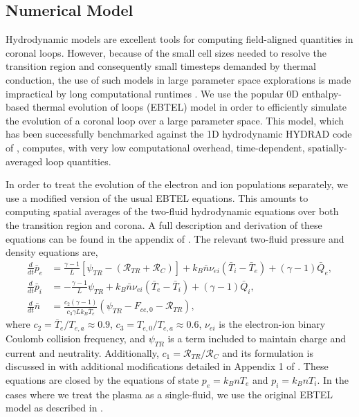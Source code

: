 \documentclass[preprint,linenumbers]{aastex}
\begin{document}
	\subsection{Numerical Model}
	\label{subsec:numerics}
	\par Hydrodynamic models are excellent tools for computing field-aligned quantities in coronal loops. However, because of the small cell sizes needed to resolve the transition region and consequently small timesteps demanded by thermal conduction, the use of such models in large parameter space explorations is made impractical by long computational runtimes \citep{bradshaw_influence_2013}. We use the popular 0D enthalpy-based thermal evolution of loops (EBTEL) model \citep{klimchuk_highly_2008,cargill_enthalpy-based_2012,cargill_enthalpy-based_2012-1,cargill_modelling_2015} in order to efficiently simulate the evolution of a coronal loop over a large parameter space. This model, which has been successfully benchmarked against the 1D hydrodynamic HYDRAD code of \citet{bradshaw_influence_2013}, computes, with very low computational overhead, time-dependent, spatially-averaged loop quantities.
	\par In order to treat the evolution of the electron and ion populations separately, we use a modified version of the usual EBTEL equations. This amounts to computing spatial averages of the two-fluid hydrodynamic equations over both the transition region and corona. A full description and derivation of these equations can be found in the appendix of . The relevant two-fluid pressure and density equations are,
	\begin{align}
		\frac{d}{dt}\bar{p}_e &= \frac{\gamma - 1}{L}\left\lbrack\psi_{TR} - (\mathcal{R}_{TR} + \mathcal{R}_C)\right\rbrack + k_B\bar{n}\nu_{ei}(\bar{T}_i - \bar{T}_e) + (\gamma - 1)\bar{Q}_e,\label{eq:ebtel2fl_pe}\\
		\frac{d}{dt}\bar{p}_i &= -\frac{\gamma - 1}{L}\psi_{TR} + k_B\bar{n}\nu_{ei}(\bar{T}_e - \bar{T}_i) + (\gamma - 1)\bar{Q}_i,\label{eq:ebtel2fl_pi}\\
		\frac{d}{dt}\bar{n} &= \frac{c_2(\gamma - 1)}{c_3\gamma Lk_B\bar{T}_e}\left(\psi_{TR} - F_{ce,0} - \mathcal{R}_{TR}\right),\label{eq:ebtel2fl_n}
	\end{align}
	where $c_2=\bar{T}_e/T_{e,a}\approx0.9$, $c_3=T_{e,0}/T_{e,a}\approx0.6$, $\nu_{ei}$ is the electron-ion binary Coulomb collision frequency, and $\psi_{TR}$ is a term included to maintain charge and current and neutrality. Additionally, $c_1=\mathcal{R}_{TR}/\mathcal{R}_C$ and its formulation is discussed in \citet{cargill_enthalpy-based_2012} with additional modifications detailed in Appendix 1 of . These equations are closed by the equations of state $p_e=k_BnT_e$ and $p_i=k_BnT_i$. In the cases where we treat the plasma as a single-fluid, we use the original EBTEL model as described in \citet{klimchuk_highly_2008,cargill_enthalpy-based_2012}.
\end{document}
